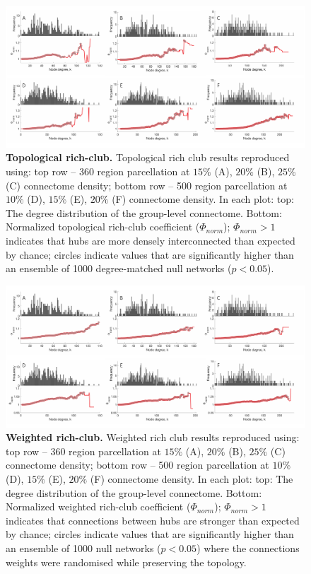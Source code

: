 \begin{figure}[h!]
\begin{center}
\includegraphics[width=1\textwidth]{Chapter5/SFigure1.pdf}%
\end{center}
\caption{\textbf{Topological rich-club.}
Topological rich club results reproduced using: top row -- 360 region parcellation at $15\%$ (A), $20\%$ (B), $25\%$ (C) connectome density; bottom row -- 500 region parcellation at $10\%$ (D), $15\%$ (E), $20\%$ (F) connectome density. In each plot: top: The degree distribution of the group-level connectome. Bottom: Normalized topological rich-club coefficient ($\Phi_{norm}$); $\Phi_{norm}>1$ indicates that hubs are more densely interconnected than expected by chance; circles indicate values that are significantly higher than an ensemble of 1000 degree-matched null networks ($p<0.05$).}
\label{fig:Ch5SFig1}
\end{figure}

\begin{figure}[h!]
\begin{center}
\includegraphics[width=1\textwidth]{Chapter5/SFigure2.pdf}%
\end{center}
\caption{\textbf{Weighted rich-club.}
Weighted rich club results reproduced using: top row -- 360 region parcellation at $15\%$ (A), $20\%$ (B), $25\%$ (C) connectome density; bottom row -- 500 region parcellation at $10\%$ (D), $15\%$ (E), $20\%$ (F) connectome density. In each plot: top: The degree distribution of the group-level connectome. Bottom: Normalized weighted rich-club coefficient ($\Phi_{norm}$); $\Phi_{norm}>1$ indicates that connections between hubs are stronger than expected by chance; circles indicate values that are significantly higher than an ensemble of 1000 null networks ($p<0.05$) where the connections weights were randomised while preserving the topology. }
\label{fig:Ch5SFig2}
\end{figure}


